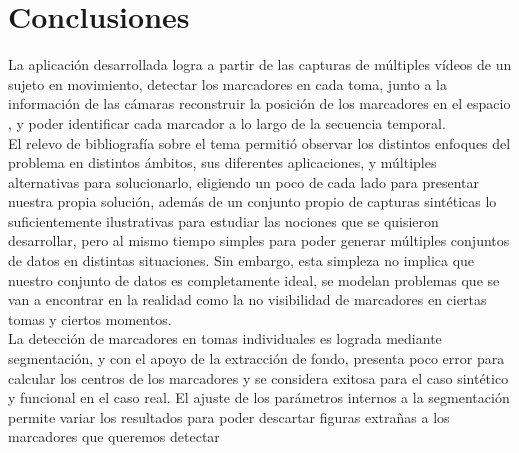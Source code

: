 \chapter{Conclusiones}



La aplicación desarrollada logra a partir de las capturas de múltiples vídeos de un sujeto en movimiento, detectar los marcadores en cada toma, junto a la información de las cámaras reconstruir la posición de los marcadores en el espacio , y poder identificar cada marcador a lo largo de la secuencia temporal.
\\ 

El relevo de bibliografía sobre el tema permitió observar los distintos enfoques del problema en distintos ámbitos, sus diferentes aplicaciones, y múltiples alternativas para solucionarlo, eligiendo un poco de cada lado para presentar nuestra propia solución, además de un conjunto propio de capturas sintéticas lo suficientemente ilustrativas para estudiar las nociones que se quisieron desarrollar, pero al mismo tiempo simples para poder generar múltiples conjuntos de datos en distintas situaciones. Sin embargo, esta simpleza no implica que nuestro conjunto de datos es completamente ideal, se modelan problemas que se van a encontrar en la realidad como la no visibilidad de marcadores en ciertas tomas y ciertos momentos.
\\ 

La detección de marcadores en tomas individuales es lograda mediante segmentación, y con el apoyo de la extracción de fondo, presenta poco error para calcular los centros de los marcadores y se considera exitosa para el caso sintético y funcional en el caso real. El ajuste de los parámetros internos a la segmentación permite variar los resultados para poder descartar figuras extrañas a los marcadores que queremos detectar
\\ 


